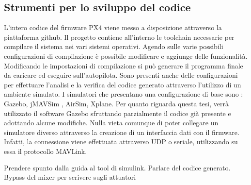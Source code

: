 \subsection{Strumenti per lo sviluppo del codice}
L'intero codice del firmware PX4 viene messo a disposizione attraverso la piattaforma github. Il progetto contiene all'interno le toolchain necessarie per compilare il sistema nei vari sistemi operativi. Agendo sulle varie possibili configurazioni di compilazione è possibile modificare e aggiunge delle funzionalità. Modificando le impostazioni di compilazione si può generare il programma finale da caricare ed eseguire sull'autopilota.
Sono presenti anche delle configurazioni per effettuare l'analisi e la verifica del codice generato attraverso l'utilizzo di un ambiente simulato. I simulatori che presentano una configurazione di base sono : Gazebo, jMAVSim , AirSim, Xplane. Per quanto riguarda questa tesi, verrà utilizzato il software Gazebo sfruttando parzialmente il codice già presente e adottando alcune modifiche. Nulla vieta comunque di poter collegare un simulatore diverso attraverso la creazione di un interfaccia dati con il firmware. Infatti, la connessione viene effettuata attraverso UDP o seriale, utilizzando su essa il protocollo MAVLink.

\begin{commento}
	Prendere spunto dalla guida al tool di simulink.
	Parlare del codice generato.
	Bypass del mixer per scrivere sugli attuatori
\end{commento}


